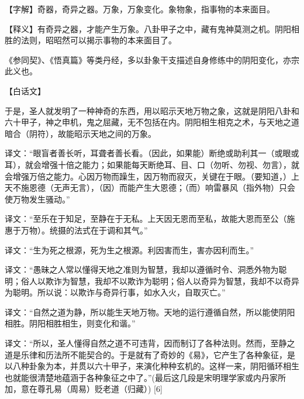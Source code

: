 \documentclass[12pt,UTF8]{ctexbook}
\begin{document}
【字解】奇器，奇异之器。万象，万象变化。象物象，指事物的本来面目。



【释义】有奇异之器，才能产生万象。八卦甲子之中，藏有鬼神莫测之机。阴阳相胜的法则，昭昭然可以揭示事物的本来面目了。


《参同契》、《悟真篇》等类丹经，多以卦象干支描述自身修练中的阴阳变化，亦宗此义也。


【白话文】


于是，圣人就发明了一种神奇的东西，用以昭示天地万物之象，这就是阴阳八卦和六十甲子，神之申机，鬼之屈藏，无不包括在内。阴阳相生相克之术，与天地之道暗合（阴符），故能昭示天地之间的万象。


译文：“眼盲者善长听，耳聋者善长看。（因此，如果能）断绝或助利其一（或眼或耳），就会增强十倍之能力；如果能每天断绝耳、目、口（勿听、勿视、勿言），就会增强万倍之能力。心因万物而躁生，因万物而寂灭，关键在于眼。（要知道，）上天不施恩德（无声无言），（因）而能产生大恩德；（而）响雷暴风（指外物）只会使万物发生骚动。”

译文：“至乐在于知足，至静在于无私。上天因无恩而至私，故能大恩而至公（施惠于万物）。统摄的法式在于调和其气。”

译文：“生为死之根源，死为生之根源。利因害而生，害亦因利而生。”

译文：“愚昧之人常以懂得天地之准则为智慧，我却以遵循时令、洞悉外物为聪明；俗人以欺诈为智慧，我却不以欺诈为聪明；俗人以奇异为智慧，我却不以奇异为聪明。所以说：以欺诈与奇异行事，如水入火，自取灭亡。”

译文：“自然之道为静，所以能生天地万物。天地的运行遵循自然，所以能使阴阳相胜。阴阳相胜相生，则变化和谐。”







译文：“所以，圣人懂得自然之道不可违背，因而制订了各种法则。然而，至静之道是乐律和历法所不能契合的。于是就有了奇妙的《易》，它产生了各种象征，是以八种卦象为本，并贯以六十甲子，来演化种种玄机的。这样一来，阴阳循环相生也就能很清楚地蕴涵于各种象征之中了。”(最后这几段是宋明理学家或内丹家所加，意在尊孔易（周易）贬老道（归藏）) [6]

\backmatter
\end{document}
